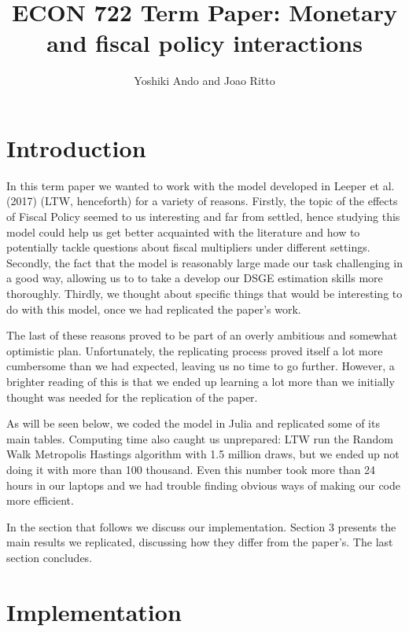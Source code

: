 \documentclass[letterpaper,12pt]{article}%
\begin{document}
\title{ECON 722 Term Paper: Monetary and fiscal policy interactions}
\author{Yoshiki Ando and Joao Ritto}
\maketitle

\section{Introduction}

In this term paper we wanted to work with the model developed in Leeper et al. (2017) (LTW, henceforth) for a variety of reasons. Firstly, the topic of the effects of Fiscal Policy seemed to us interesting and far from settled, hence studying this model could help us get better acquainted with the literature and how to potentially tackle questions about fiscal multipliers under different settings. Secondly, the fact that the model is reasonably large made our task challenging in a good way, allowing us to to take a develop our DSGE estimation skills more thoroughly. Thirdly, we thought about specific things that would be interesting to do with this model, once we had replicated the paper's work.

The last of these reasons proved to be part of an overly ambitious and somewhat optimistic plan. Unfortunately, the replicating process proved itself a lot more cumbersome than we had expected, leaving us no time to go further. However, a brighter reading of this is that we ended up learning a lot more than we initially thought was needed for the replication of the paper.

As will be seen below, we coded the model in Julia and replicated some of its main tables. Computing time also caught us unprepared: LTW run the Random Walk Metropolis Hastings algorithm with 1.5 million draws, but we ended up not doing it with more than 100 thousand. Even this number took more than 24 hours in our laptops and we had trouble finding obvious ways of making our code more efficient.

In the section that follows we discuss our implementation. Section 3 presents the main results we replicated, discussing how they differ from the paper's. The last section concludes.

\section{Implementation}
\end{document}
